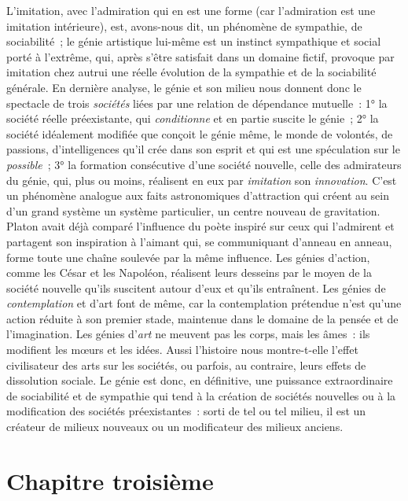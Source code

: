 \documentclass[french,twoside]{book} %
\newcommand\chapteropen{} %
\newcommand\chapterclose{} %
\begin{document}
L’imitation, avec l’admiration qui en est une forme (car l’admiration est une imitation intérieure), est, avons-nous dit, un phénomène de sympathie, de sociabilité ; le génie artistique lui-même est un instinct sympathique et social porté à l’extrême, qui, après s’être satisfait dans un domaine fictif, provoque par imitation chez autrui une réelle évolution de la sympathie et de la sociabilité générale. En dernière analyse, le génie et son milieu nous donnent donc le spectacle de trois \emph{sociétés} liées par une relation de dépendance mutuelle : 1° la société réelle préexistante, qui \emph{conditionne} et en partie suscite le génie ; 2° la société idéalement modifiée que conçoit le génie même, le monde de volontés, de passions, d’intelligences qu’il crée dans son esprit et qui est une spéculation sur le \emph{possible} ; 3° la formation consécutive d’une société nouvelle, celle des admirateurs du génie, qui, plus ou moins, réalisent en eux par \emph{imitation} son \emph{innovation}. C’est un phénomène analogue aux faits astronomiques d’attraction qui créent au sein d’un grand système un système particulier, un centre nouveau de gravitation. Platon avait déjà comparé l’influence du poète inspiré sur ceux qui l’admirent et partagent son inspiration à l’aimant qui, se communiquant d’anneau en anneau, forme toute une chaîne soulevée par la même influence. Les génies d’action, comme les César et les Napoléon, réalisent leurs desseins par le moyen de la société nouvelle qu’ils suscitent autour d’eux et qu’ils entraînent. Les génies de \emph{contemplation} et d’art font de même, car la contemplation prétendue n’est qu’une action réduite à son premier stade, maintenue dans le domaine de la pensée et de l’imagination. Les génies d’\emph{art} ne meuvent pas les corps, mais les âmes : ils modifient les mœurs et les idées. Aussi l’histoire nous montre-t-elle l’effet civilisateur des arts sur les sociétés, ou parfois, au contraire, leurs effets de dissolution sociale. Le génie est donc, en définitive, une puissance extraordinaire de sociabilité et de sympathie qui tend à la création de sociétés nouvelles ou à la modification des sociétés préexistantes : sorti de tel ou tel milieu, il est un créateur de milieux nouveaux ou un modificateur des milieux anciens.
\chapterclose


\chapteropen
\chapter[{Chapitre troisième}]{Chapitre troisième}\renewcommand{\leftmark}{Chapitre troisième}
\end{document}
